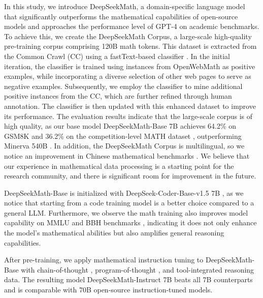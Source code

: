 In this study, we introduce DeepSeekMath, a domain-specific language model that significantly outperforms the mathematical capabilities of open-source models and approaches the performance level of GPT-4 on academic benchmarks. To achieve this, we create the DeepSeekMath Corpus, a large-scale high-quality pre-training corpus comprising 120B math tokens. This dataset is extracted from the Common Crawl (CC) using a fastText-based classifier \citep{joulin2016fasttext}. In the initial iteration, the classifier is trained using instances from OpenWebMath \citep{openwebmath} as positive examples, while incorporating a diverse selection of other web pages to serve as negative examples. Subsequently, we employ the classifier to mine additional positive instances from the CC, which are further refined through human annotation. The classifier is then updated with this enhanced dataset to improve its performance. The evaluation results indicate that the large-scale corpus is of high quality, as our base model DeepSeekMath-Base 7B achieves 64.2\% on GSM8K \citep{gsm8k} and 36.2\% on the competition-level MATH dataset \citep{MATH}, outperforming Minerva 540B \citep{minerva}. In addition, the DeepSeekMath Corpus is multilingual, so we notice an improvement in Chinese mathematical benchmarks \citep{wei2023cmath,agieval}. We believe that our experience in mathematical data processing is a starting point for the research community, and there is significant room for improvement in the future.

DeepSeekMath-Base is initialized with DeepSeek-Coder-Base-v1.5 7B \citep{deepseek-coder}, as we notice that starting from a code training model is a better choice compared to a general LLM. Furthermore, we observe the math training also improves model capability on MMLU \citep{mmlu} and BBH benchmarks \citep{bbh}, indicating it does not only enhance the model's mathematical abilities but also amplifies general reasoning capabilities.

After pre-training, we apply mathematical instruction tuning to DeepSeekMath-Base with chain-of-thought \citep{cot}, program-of-thought \citep{pot,pal}, and tool-integrated reasoning \citep{tora} data. The resulting model DeepSeekMath-Instruct 7B beats all 7B counterparts and is comparable with 70B open-source instruction-tuned models.  

